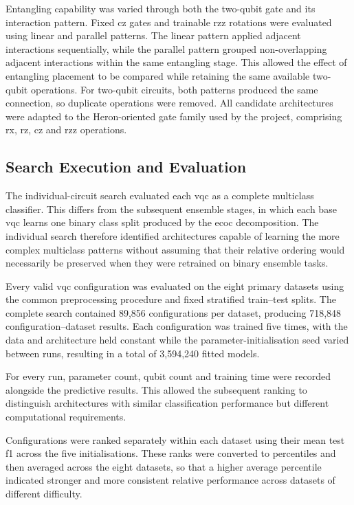 \documentclass[]{UCD_CS_MSc_AAI_Report}
\begin{document}
Entangling capability was varied through both the two-qubit gate and its interaction pattern. Fixed \ac{cz} gates and trainable \acs{rzz} rotations were evaluated using linear and parallel patterns. The linear pattern applied adjacent interactions sequentially, while the parallel pattern grouped non-overlapping adjacent interactions within the same entangling stage. This allowed the effect of entangling placement to be compared while retaining the same available two-qubit operations. For two-qubit circuits, both patterns produced the same connection, so duplicate operations were removed. All candidate architectures were adapted to the Heron-oriented gate family used by the project, comprising \acs{rx}, \acs{rz}, \acs{cz} and \acs{rzz} operations.

\subsection{Search Execution and Evaluation}

The individual-circuit search evaluated each \ac{vqc} as a complete multiclass classifier. This differs from the subsequent ensemble stages, in which each base \ac{vqc} learns one binary class split produced by the \ac{ecoc} decomposition. The individual search therefore identified architectures capable of learning the more complex multiclass patterns without assuming that their relative ordering would necessarily be preserved when they were retrained on binary ensemble tasks.

Every valid \ac{vqc} configuration was evaluated on the eight primary datasets using the common preprocessing procedure and fixed stratified train--test splits. The complete search contained 89,856 configurations per dataset, producing 718,848 configuration--dataset results. Each configuration was trained five times, with the data and architecture held constant while the parameter-initialisation seed varied between runs, resulting in a total of 3,594,240 fitted models.

For every run, parameter count, qubit count and training time were recorded alongside the predictive results. This allowed the subsequent ranking to distinguish architectures with similar classification performance but different computational requirements.

Configurations were ranked separately within each dataset using their mean test \acl{f1} across the five initialisations. These ranks were converted to percentiles and then averaged across the eight datasets, so that a higher average percentile indicated stronger and more consistent relative performance across datasets of different difficulty.
\end{document}
